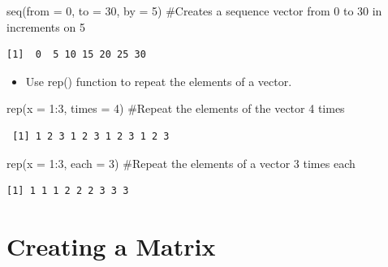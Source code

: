 \documentclass[
  letterpaper,
  DIV=11,
  numbers=noendperiod]{scrreprt}
\newenvironment{Shaded}{\begin{snugshade}}{\end{snugshade}}
\newcommand{\AttributeTok}[1]{\textcolor[rgb]{0.40,0.45,0.13}{#1}}
\newcommand{\CommentTok}[1]{\textcolor[rgb]{0.37,0.37,0.37}{#1}}
\newcommand{\DecValTok}[1]{\textcolor[rgb]{0.68,0.00,0.00}{#1}}
\newcommand{\FunctionTok}[1]{\textcolor[rgb]{0.28,0.35,0.67}{#1}}
\newcommand{\NormalTok}[1]{\textcolor[rgb]{0.00,0.23,0.31}{#1}}
\newcommand{\SpecialCharTok}[1]{\textcolor[rgb]{0.37,0.37,0.37}{#1}}
\providecommand{\tightlist}{%
  \setlength{\itemsep}{0pt}\setlength{\parskip}{0pt}}\usepackage{longtable,booktabs,array}
\begin{document}
\begin{Shaded}
\begin{Highlighting}[]
\FunctionTok{seq}\NormalTok{(}\AttributeTok{from =} \DecValTok{0}\NormalTok{, }\AttributeTok{to =} \DecValTok{30}\NormalTok{, }\AttributeTok{by =} \DecValTok{5}\NormalTok{)  }\CommentTok{\#Creates a sequence vector from 0 to 30 in increments on 5 }
\end{Highlighting}
\end{Shaded}

\begin{verbatim}
[1]  0  5 10 15 20 25 30
\end{verbatim}

\begin{itemize}
\tightlist
\item
  Use rep() function to repeat the elements of a vector.
\end{itemize}

\begin{Shaded}
\begin{Highlighting}[]
\FunctionTok{rep}\NormalTok{(}\AttributeTok{x =} \DecValTok{1}\SpecialCharTok{:}\DecValTok{3}\NormalTok{, }\AttributeTok{times =} \DecValTok{4}\NormalTok{)  }\CommentTok{\#Repeat the elements of the vector 4 times}
\end{Highlighting}
\end{Shaded}

\begin{verbatim}
 [1] 1 2 3 1 2 3 1 2 3 1 2 3
\end{verbatim}

\begin{Shaded}
\begin{Highlighting}[]
\FunctionTok{rep}\NormalTok{(}\AttributeTok{x =} \DecValTok{1}\SpecialCharTok{:}\DecValTok{3}\NormalTok{, }\AttributeTok{each =} \DecValTok{3}\NormalTok{)  }\CommentTok{\#Repeat the elements of a vector 3 times each}
\end{Highlighting}
\end{Shaded}

\begin{verbatim}
[1] 1 1 1 2 2 2 3 3 3
\end{verbatim}

\section{Creating a Matrix}\label{creating-a-matrix}
\end{document}
